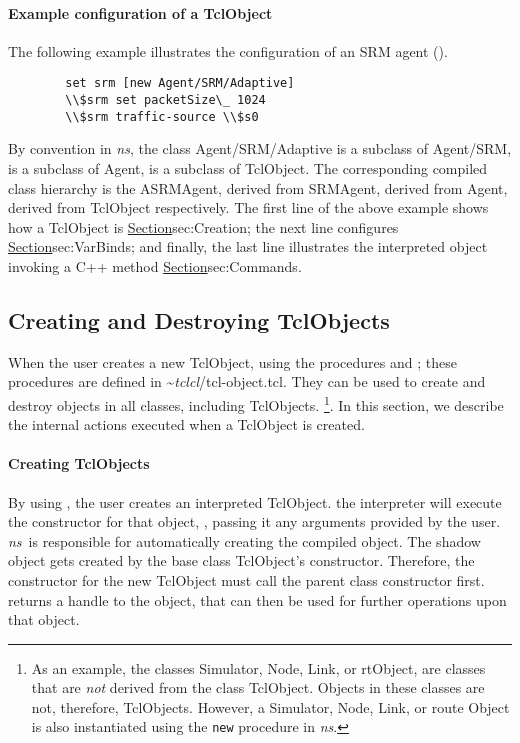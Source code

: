 \paragraph{Example configuration of a TclObject}
The following example illustrates the configuration of
an SRM agent ().
\begin{verbatim}
        set srm [new Agent/SRM/Adaptive]
        \\$srm set packetSize\_ 1024
        \\$srm traffic-source \\$s0
\end{verbatim}
By convention in \emph{ns},
the class Agent/SRM/Adaptive is a subclass of Agent/SRM,
is a subclass of Agent, is a subclass of TclObject.
The corresponding compiled class hierarchy is
the ASRMAgent, derived from SRMAgent, derived from Agent,
derived from TclObject respectively.
The first line of the above example shows how a TclObject is 
\href{created (or destroyed)}{Section}{sec:Creation};
the next line configures
\href{a bound variable}{Section}{sec:VarBinds};
and finally, the last line illustrates
the interpreted object invoking a C++ method
\href{as if they were an instance procedure}{Section}{sec:Commands}.

\subsection{Creating and Destroying TclObjects}
\label{sec:Creation}

When the user creates a new TclObject,
using the procedures  and ;
these procedures are defined in \textasciitilde\emph{tclcl}/{tcl-object.tcl}.
They can be used to create and destroy objects in all classes,
including TclObjects.%
\footnote{As an example, the classes Simulator, Node, Link, or rtObject,
are classes that are \emph{not} derived from the class TclObject.
Objects in these classes  are not, therefore, TclObjects.
However, a Simulator, Node, Link, or route Object is also instantiated
using the {\tt new} procedure in \emph{ns}.}.
In this section,
we describe the internal actions executed when a TclObject
is created.

\paragraph{Creating TclObjects}
By using , the user creates an interpreted TclObject.
the interpreter will execute the constructor for that object, ,
passing it any arguments provided by the user.
\emph{ns}\ is responsible for automatically  creating the compiled object.
The shadow object gets created by the base class TclObject's constructor.
Therefore, the constructor for the new TclObject
must call the parent class constructor first.
 returns a handle to the object, that can then be used
for further operations upon that object.

